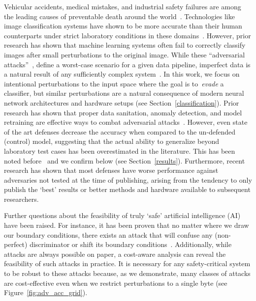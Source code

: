 \documentclass[lettersize,journal]{IEEEtran}
\begin{document}
Vehicular accidents, medical mistakes, and industrial safety failures are among the leading causes of preventable death around the world~\cite{OECD, makary2016medical, icoh}. Technologies like image classification systems have shown to be more accurate than their human counterparts under strict laboratory conditions in these domains~\cite{nhtsa, pakdemirli2019artificial, bernal2017safety++}. However, prior research has shown that machine learning systems often fail to correctly classify images after small perturbations to the original image. While these ``adversarial attacks''~\cite{chakraborty_adversarial_2018, biggio_evasion_2013-1}, define a worst-case scenario for a given data pipeline, imperfect data is a natural result of any sufficiently complex system~\cite{pearson2005mining}. In this work, we focus on intentional perturbations to the input space where the goal is to~\emph{evade} a classifier, but similar perturbations are a natural consequence of modern neural network architectures and hardware setups (see Section~\ref{classification}). Prior research has shown that proper data sanitation, anomaly detection, and model retraining are effective ways to combat adversarial attacks~\cite{chakraborty_adversarial_2018,  grigorescu2020survey, li_general_2016, wang_security_2019}. However, even state of the art defenses decrease the accuracy when compared to the un-defended (control) model, suggesting that the actual ability to generalize beyond laboratory test cases has been overestimated in the literature. This has been noted before~\cite{ biggio_evasion_2013, carlini_towards_2017, wang_security_2019, li_general_2016} and we confirm below (see Section~\ref{results}). Furthermore, recent research \cite{croce_reliable_2020} has shown that most defenses have worse performance against adversaries not tested at the time of publishing, arising from the tendency to only publish the `best' results or better methods and hardware available to subsequent researchers.

Further questions about the feasibility of truly `safe' artificial intelligence (AI) have been raised. For instance, it has been proven that no matter where we draw our boundary conditions, there exists an attack that will confuse any (non-perfect) discriminator or shift its boundary conditions~\cite{dohmatob_generalized_2019}. Additionally, while attacks are always possible on paper, a cost-aware analysis can reveal the feasibility of such attacks in practice. It is necessary for any safety-critical system to be robust to these attacks because, as we demonstrate, many classes of attacks are cost-effective even when we restrict perturbations to a single byte (see Figure~\ref{fig:adv_acc_grid}). 
\end{document}
